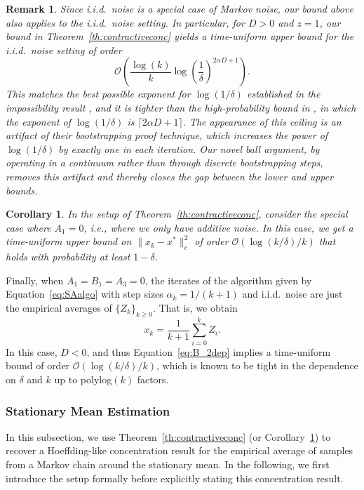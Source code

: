 \documentclass{article}
\newcommand{\lrp}[1]{\left( #1 \right)}
\newcommand{\xk}{x_k}
\newtheorem{corollary}{Corollary}[theorem]
\newtheorem{remark}{Remark}
\begin{document}
\begin{remark}\label{rem:bootstrapvsball}
Since i.i.d.\ noise is a special case of Markov noise, our bound above also applies to the i.i.d.\ noise setting. In particular, for $D > 0$ and $z = 1$, our bound in Theorem~\ref{th:contractiveconc} yields a time-uniform upper bound for the i.i.d.\ noise setting of order
\[ \mathcal{O}\lrp{\frac{\log(k)}{k}{\log\left(\frac{1}{\delta}\right)^{2\alpha D+1}} }. \] 
This matches the best possible exponent for $\log(1/\delta)$ established in the impossibility result \citet[Theorem 2.2]{chen2025concentration}, and it is tighter than the high-probability bound in \citet[Theorem 2.3]{chen2025concentration}, in which the exponent of $\log(1/\delta)$ is $\lceil 2\alpha D + 1\rceil$. The appearance of this ceiling is an artifact of their bootstrapping  proof technique, which increases the power of $\log(1/\delta)$ by exactly one in each iteration. Our novel ball argument, by operating in a continuum rather than through discrete bootstrapping steps, removes this artifact and thereby closes the gap between the lower and upper bounds. %
\end{remark}


\begin{corollary}\label{cor:additive_contbound}
In the setup of Theorem~\ref{th:contractiveconc}, consider the special case where $A_1 = 0$, i.e., where we only have additive noise. %
In this case, we get a time-uniform upper bound on $\|\xk - x^*\|^2_c$ of order $\mathcal{O}(\log(k/\delta)/k)$ %
that holds with probability at least $1-\delta$. 
\end{corollary}
Finally, when $A_1 = B_1 = A_3  = 0$, the iterates of the algorithm given by Equation~\eqref{eq:SAalgo} with step sizes $\alpha_k = 1/(k+1)$ and i.i.d.\ noise are just the empirical averages of $\{Z_k\}_{k\geq 0}$. That is, we obtain
\[ x_k = \frac{1}{k+1} \sum_{i=0}^k Z_i. \]
In this case, $D < 0$, and thus Equation~\eqref{eq:B_2dep} implies a time-uniform bound of order $\mathcal{O}(%
\log(k/\delta)/k)$, which is known to be tight in the dependence on $\delta$ and $k$ up to polylog$(k)$ factors. 





\subsubsection{Stationary Mean Estimation}
In this subsection, we use Theorem~\ref{th:contractiveconc} (or Corollary~\ref{cor:additive_contbound}) to recover a Hoeffding-like concentration result for the empirical average of samples from a Markov chain around the stationary mean. In the following, we first introduce the setup formally before explicitly stating this concentration result. 
\end{document}
